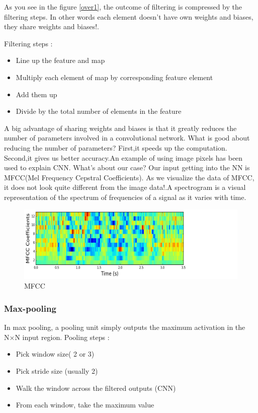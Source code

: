 \documentclass{article}
\begin{document}
As you see in the figure \ref{over1}, the outcome of filtering is compressed by the filtering steps. In other words each element doesn’t have own weights and biases, they share weights and biases!.

Filtering steps {\protect\cite{CON}}:
\begin{itemize}
\item Line up the feature and map
\item Multiply each element of map by corresponding feature element
\item Add them up
\item Divide by the total number of elements in the feature
\end{itemize}
A big advantage of sharing weights and biases is that it greatly reduces the number of parameters involved in a convolutional network.
What is good about reducing the number of parameters? First,it speeds up the computation. Second,it gives us better accuracy.An example of using image pixels has been used to explain CNN.
What’s about our case? Our input getting into the NN is MFCC(Mel Frequency Cepstral Coefficients). As we visualize the data of MFCC, it does not look quite different from the image data!.A spectrogram is a visual representation of the spectrum of frequencies of a signal as it varies with time. 

\begin{figure}[H]
\includegraphics[scale=0.25]{img/MFCC.png}
\caption{MFCC \protect\cite{AU}}
\label{mfcc}
\end{figure}

\subsubsection{Max-pooling}
In max pooling, a pooling unit simply outputs the maximum activation in the N×N input region.
Pooling steps {\protect\cite{CON}}:
\begin{itemize}
\item Pick window size( 2 or 3)
\item Pick stride size (usually 2)
\item Walk the window across the filtered outputs (CNN)
\item From each window, take the maximum value
\end{itemize}
\end{document}
